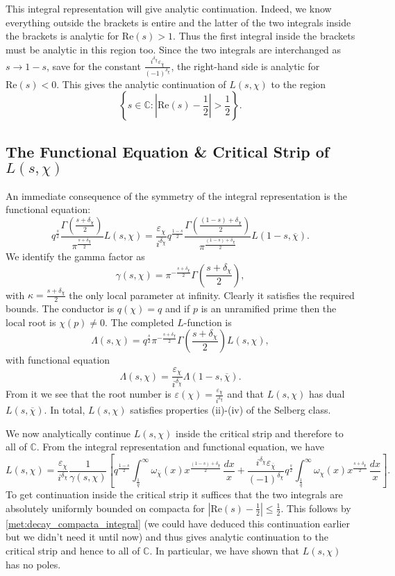 \documentclass[12pt]{book}
\theoremstyle{definition}\newframedtheorem{method}{Method}
\newcommand{\C}{\mathbb{C}}
\newcommand{\g}{\gamma}
\renewcommand{\d}{\delta}
\renewcommand{\k}{\kappa}
\newcommand{\w}{\omega}
\newcommand{\G}{\Gamma}
\renewcommand{\L}{\Lambda}
\newcommand{\e}{\varepsilon}
\newcommand{\<}{\langle}
\renewcommand{\>}{\rangle}
\newcommand{\conj}{\overline}
\newcommand{\cchi}{\conj{\chi}}
\renewcommand{\Re}{\mathrm{Re}}
\begin{document}
      This integral representation will give analytic continuation. Indeed, we know everything outside the brackets is entire and the latter of the two integrals inside the brackets is analytic for $\Re(s) > 1$. Thus the first integral inside the brackets must be analytic in this region too. Since the two integrals are interchanged as $s \to 1-s$, save for the constant $\frac{i^{\d_{\chi}}\e_{\cchi}}{(-1)^{\d_{\chi}}}$, the right-hand side is analytic for $\Re(s) < 0$. This gives the analytic continuation of $L(s,\chi)$ to the region
      \[
        \left\{s \in \C:\left|\Re(s)-\frac{1}{2}\right| > \frac{1}{2}\right\}.
      \]
    \subsection*{The Functional Equation \& Critical Strip of \texorpdfstring{$L(s,\chi)$}{L(s,x)}}
      An immediate consequence of the symmetry of the integral representation is the functional equation:
      \[
        q^{\frac{s}{2}}\frac{\G\left(\frac{s+\d_{\chi}}{2}\right)}{\pi^{\frac{s+\d_{\chi}}{2}}}L(s,\chi) = \frac{\e_{\chi}}{i^{\d_{\chi}}}q^{\frac{1-s}{2}}\frac{\G\left(\frac{(1-s)+\d_{\chi}}{2}\right)}{\pi^{\frac{(1-s)+\d_{\chi}}{2}}}L(1-s,\cchi).
      \]
      We identify the gamma factor as
      \[
        \g(s,\chi) = \pi^{-\frac{s+\d_{\chi}}{2}}\G\left(\frac{s+\d_{\chi}}{2}\right),
      \]
      with $\k = \frac{s+\d_{\chi}}{2}$ the only local parameter at infinity. Clearly it satisfies the required bounds. The conductor is $q(\chi) = q$ and if $p$ is an unramified prime then the local root is $\chi(p) \neq 0$. The completed $L$-function is
      \[
        \L(s,\chi) = q^{\frac{s}{2}}\pi^{-\frac{s+\d_{\chi}}{2}}\G\left(\frac{s+\d_{\chi}}{2}\right)L(s,\chi),
      \]
      with functional equation
      \[
        \L(s,\chi) = \frac{\e_{\chi}}{i^{\d_{\chi}}}\L(1-s,\cchi).
      \]
      From it we see that the root number is $\e(\chi) = \frac{\e_{\chi}}{i^{\d_{\chi}}}$ and that $L(s,\chi)$ has dual $L(s,\cchi)$. In total, $L(s,\chi)$ satisfies properties (ii)-(iv) of the Selberg class.

      We now analytically continue $L(s,\chi)$ inside the critical strip and therefore to all of $\C$. From the integral representation and functional equation, we have
      \begin{equation}\label{equ:integral_representation_Dirichlet_L-functions_2}
        L(s,\chi) = \frac{\e_{\chi}}{i^{\d_{\chi}}}\frac{1}{\g(s,\chi)}\left[q^{\frac{1-s}{2}}\int_{\frac{1}{q}}^{\infty}\w_{\cchi}(x)x^{\frac{(1-s)+\d_{\chi}}{2}}\,\frac{dx}{x}+\frac{i^{\d_{\chi}}\e_{\cchi}}{(-1)^{\d_{\chi}}}q^{\frac{s}{2}}\int_{\frac{1}{q}}^{\infty}\w_{\chi}(x)x^{\frac{s+\d_{\chi}}{2}}\,\frac{dx}{x}\right].
      \end{equation}
      To get continuation inside the critical strip it suffices that the two integrals are absolutely uniformly bounded on compacta for $|\Re(s)-\frac{1}{2}| \le \frac{1}{2}$. This follows by \cref{met:decay_compacta_integral} (we could have deduced this continuation earlier but we didn't need it until now) and thus gives analytic continuation to the critical strip and hence to all of $\C$. In particular, we have shown that $L(s,\chi)$ has no poles.
\end{document}
